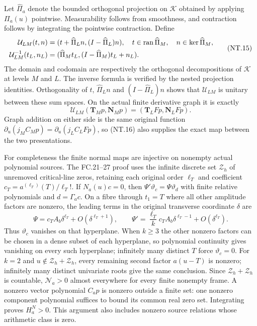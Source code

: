 Let $\widehat\Pi_a$ denote the bounded orthogonal projection on
$\mathscr K$ obtained by applying $\Pi_a(u)$ pointwise.
Measurability follows from smoothness, and contraction follows
by integrating the pointwise contraction. Define
\[
 \begin{aligned}
 \mathcal U_{LM}(t,n)
    &=(t+\widehat\Pi_Ln,(I-\widehat\Pi_L)n),\quad
       t\in\operatorname{ran}\widehat\Pi_M,\quad n\in\ker\widehat\Pi_M,\\
 \mathcal U_{LM}^{-1}(t_L,n_L)
    &=(\widehat\Pi_Mt_L,
           (I-\widehat\Pi_M)t_L+n_L).
 \end{aligned}
 \tag{NT.15}
\]
The domain and codomain are respectively the orthogonal decompositions
of $\mathscr K$ at levels $M$ and $L$. The inverse formula is
verified by the nested projection identities. Orthogonality of
$t$, $\widehat\Pi_Ln$ and $(I-\widehat\Pi_L)n$ shows that
$\mathcal U_{LM}$ is unitary between these sum spaces.
On the actual finite derivative graph it is exactly
\[
 \mathcal U_{LM}(\mathbf T_Mp,\mathbf N_Mp)
       =(\mathbf T_LFp,\mathbf N_LFp).
 \tag{NT.16}
\]
Graph addition on either side is the same original function
$\partial_u(j_MC_Mp)=\partial_u(j_LC_LFp)$, so (NT.16)
also supplies the exact map between the two presentations.

For completeness the finite normal maps are injective on nonempty
actual polynomial sources. The FC.21--27 proof uses the infinite
discrete set $\mathcal Z_h$ of unremoved critical-line zeros,
retaining each original order $\ell_T$ and coefficient
$c_T=a^{(\ell_T)}(T)/\ell_T!$. If $N_a(u)c=0$, then
$\Psi'\vartheta_c=\Psi\vartheta_d$ with finite relative
polynomials and $d=\Gamma_ac$. On a fibre through $t_1=T$
where all other amplitude factors are nonzero, the leading
terms in the original transverse coordinate $\delta$ are
\[
 \Psi=c_TA_b\delta^{\ell_T}+O(\delta^{\ell_T+1}),\qquad
 \Psi'=\frac{\ell_T}{k}c_TA_b\delta^{\ell_T-1}
                                      +O(\delta^{\ell_T}).
 \tag{NT.17}
\]
Thus $\vartheta_c$ vanishes on that hyperplane. When $k\ge3$
the other nonzero factors can be chosen in a dense subset of each
hyperplane, so polynomial continuity gives vanishing on every such
hyperplane; infinitely many distinct $T$ force $\vartheta_c=0$.
For $k=2$ and $u\notin\mathcal Z_h+\mathcal Z_h$, every
remaining second factor $a(u-T)$ is nonzero; infinitely many
distinct univariate roots give the same conclusion. Since
$\mathcal Z_h+\mathcal Z_h$ is countable, $\mathcal N_a>0$
almost everywhere for every finite nonempty frame. A nonzero
vector polynomial $C_ap$ is nonzero outside a finite set: one
nonzero component polynomial suffices to bound its common real
zero set. Integrating proves $H_a^N>0$. This argument also
includes nonzero source relations whose arithmetic class is zero.

